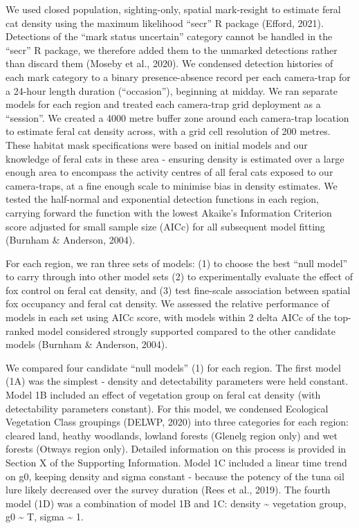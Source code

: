 \documentclass[]{elsarticle} %
\begin{document}
We used closed population, sighting-only, spatial mark-resight to estimate feral cat density using the maximum likelihood ``secr'' R package (Efford, 2021). Detections of the ``mark status uncertain'' category cannot be handled in the ``secr'' R package, we therefore added them to the unmarked detections rather than discard them (Moseby et al., 2020). We condensed detection histories of each mark category to a binary presence-absence record per each camera-trap for a 24-hour length duration (``occasion''), beginning at midday. We ran separate models for each region and treated each camera-trap grid deployment as a ``session''. We created a 4000 metre buffer zone around each camera-trap location to estimate feral cat density across, with a grid cell resolution of 200 metres. These habitat mask specifications were based on initial models and our knowledge of feral cats in these area - ensuring density is estimated over a large enough area to encompass the activity centres of all feral cats exposed to our camera-traps, at a fine enough scale to minimise bias in density estimates. We tested the half-normal and exponential detection functions in each region, carrying forward the function with the lowest Akaike's Information Criterion score adjusted for small sample size (AICc) for all subsequent model fitting (Burnham \& Anderson, 2004).

For each region, we ran three sets of models: (1) to choose the best ``null model'' to carry through into other model sets (2) to experimentally evaluate the effect of fox control on feral cat density, and (3) test fine-scale association between spatial fox occupancy and feral cat density. We assessed the relative performance of models in each set using AICc score, with models within 2 delta AICc of the top-ranked model considered strongly supported compared to the other candidate models (Burnham \& Anderson, 2004).

We compared four candidate ``null models'' (1) for each region. The first model (1A) was the simplest - density and detectability parameters were held constant.
Model 1B included an effect of vegetation group on feral cat density (with detectability parameters constant). For this model, we condensed Ecological Vegetation Class groupings (DELWP, 2020) into three categories for each region: cleared land, heathy woodlands, lowland forests (Glenelg region only) and wet forests (Otways region only). Detailed information on this process is provided in Section X of the Supporting Information. Model 1C included a linear time trend on g0, keeping density and sigma constant - because the potency of the tuna oil lure likely decreased over the survey duration (Rees et al., 2019). The fourth model (1D) was a combination of model 1B and 1C: density \textasciitilde{} vegetation group, g0 \textasciitilde{} T, sigma \textasciitilde{} 1.
\end{document}

